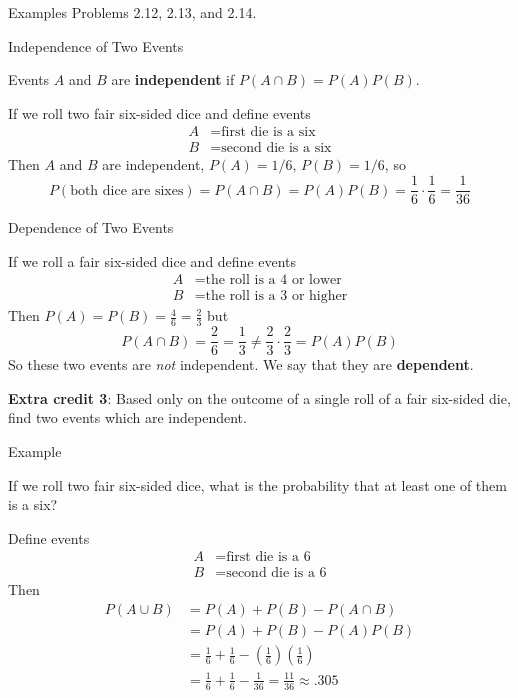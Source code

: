 \documentclass[xcolor=table]{beamer}
\renewcommand{\emph}{\textbf}
\begin{document}
\begin{frame}{Examples}
Problems 2.12, 2.13, and 2.14.
\vspace{4in}
\end{frame}


\begin{frame}{Independence of Two Events}
\begin{definition}
Events $A$ and $B$ are \emph{independent} if
$P(A \cap B) = P(A)P(B)$.
\end{definition}
\pause\begin{example}
If we roll two fair six-sided dice and define events
\begin{align*}
A &= \text{first die is a six} \\
B &= \text{second die is a six}
\end{align*}
Then $A$ and $B$ are independent, $P(A)=1/6$, $P(B)=1/6$, so
$$P(\text{both dice are sixes}) = P(A\cap B)= P(A)P(B)=\frac16\cdot\frac16=\frac1{36}$$
\end{example}
\end{frame}

\begin{frame}{Dependence of Two Events}
\begin{example}
If we roll a fair six-sided dice and define events
\begin{align*}
A &= \text{the roll is a 4 or lower} \\
B &= \text{the roll is a 3 or higher}
\end{align*}
Then $P(A)=P(B)=\frac46=\frac23$ but $$P(A\cap B)=\frac26=\frac13 \neq \frac23\cdot\frac23=P(A)P(B)$$
So these two events are \textit{not} independent. We say that they are \emph{dependent}.
\end{example}

\textbf{Extra credit 3}: Based only on the outcome of a single roll of a fair six-sided die, find two events which are independent.
\end{frame}

\begin{frame}{Example}
\begin{problem}If we roll two fair six-sided dice, what is the probability that at least one of them is a six?
\end{problem}
Define events
\begin{align*}
A &= \text{first die is a 6}\\
B &= \text{second die is a 6}
\end{align*}
\pause Then
\begin{align*}
P(A\cup B)&=P(A)+P(B)-P(A\cap B) \\
&=P(A)+P(B)-P(A)P(B) \\
&=\frac16+\frac16-\left(\frac16\right)\left(\frac16\right) \\
&=\frac16+\frac16-\frac1{36} = \frac{11}{36} \approx .305
\end{align*}
\end{frame}
\end{document}
